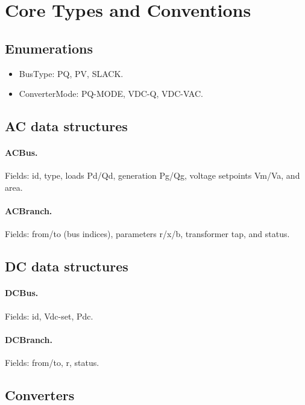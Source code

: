 \documentclass[11pt]{article}
\def\code#1{#1}%
\def\_{-}%
\newcommand{\code}[1]{\nolinkurl{#1}}
\begin{document}
\section{Core Types and Conventions}

\subsection{Enumerations}
\begin{itemize}[leftmargin=*]
  \item \code{BusType}: \code{PQ}, \code{PV}, \code{SLACK}.
  \item \code{ConverterMode}: \code{PQ\_MODE}, \code{VDC\_Q}, \code{VDC\_VAC}.
\end{itemize}

\subsection{AC data structures}
\paragraph{\code{ACBus}.} Fields: \code{id}, \code{type}, loads \code{Pd/Qd}, generation \code{Pg/Qg}, voltage setpoints \code{Vm/Va}, and \code{area}.

\paragraph{\code{ACBranch}.} Fields: \code{from/to} (bus indices), parameters \code{r/x/b}, transformer \code{tap}, and \code{status}.

\subsection{DC data structures}
\paragraph{\code{DCBus}.} Fields: \code{id}, \code{Vdc\_set}, \code{Pdc}.

\paragraph{\code{DCBranch}.} Fields: \code{from/to}, \code{r}, \code{status}.

\subsection{Converters}
\end{document}
